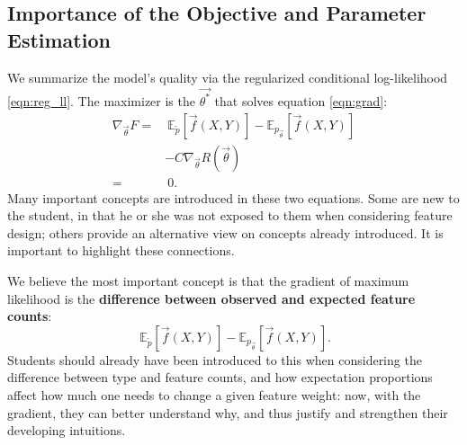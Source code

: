 \documentclass[11pt,letterpaper]{article}
\newcommand{\empirical}[0]{\ensuremath{\tilde{p}}}
\begin{document}

\subsection{Importance of the Objective and Parameter Estimation} %

We summarize the model's quality via the regularized conditional
log-likelihood \eqref{eqn:reg_ll}.  
The maximizer is the $\vec{\theta^*}$ that solves equation \eqref{eqn:grad}:
\begin{equation}
\begin{aligned}
\nabla_{\vec{\theta}} F
 = &
\ \mathbb{E}_{\empirical{}}\left[\vec{f}(X,Y)\right] 
- \mathbb{E}_{{p_{\vec{\theta}}}}\left[\vec{f}(X,Y)\right]\\
 & - C \nabla_{\vec{\theta}}R(\vec{\theta})
\label{eqn:grad} \\
 = &\ 0.
\end{aligned}
\end{equation}
Many important concepts are introduced in these two equations. Some are new to the student, in that he or
she was not exposed to them when considering feature design; others provide an alternative view
on concepts already introduced. It is important to highlight these connections.

We believe the most important concept is that the gradient of
maximum likelihood is the \textbf{difference 
between observed and expected feature counts}:
\begin{equation}
\ \mathbb{E}_{\empirical{}}\left[\vec{f}(X,Y)\right] 
- \mathbb{E}_{p_{\vec{\theta}}}\left[\vec{f}(X,Y)\right].
\label{eqn:obsexp} 
\end{equation}
Students should already have been introduced to this when considering the difference between type and 
feature counts, and how expectation proportions affect how much one needs to change a given feature weight: 
now, with the gradient, they can better understand why, and thus justify and strengthen their developing intuitions.
\end{document}
